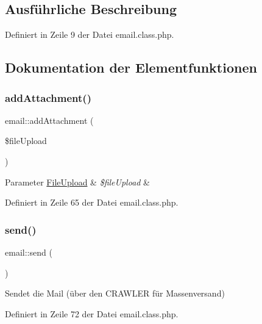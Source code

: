 \subsection{Ausführliche Beschreibung}


Definiert in Zeile 9 der Datei email.\+class.\+php.



\subsection{Dokumentation der Elementfunktionen}
\mbox{\label{classemail_a802b48dc37651e8c44f4d0584382bf0e}} 
\subsubsection{\texorpdfstring{add\+Attachment()}{addAttachment()}}
{\footnotesize\ttfamily email\+::add\+Attachment (\begin{DoxyParamCaption}\item[{}]{\$file\+Upload }\end{DoxyParamCaption})}


\begin{DoxyParams}[1]{Parameter}
\mbox{\hyperlink{class_file_upload}{File\+Upload}} & {\em \$file\+Upload} & \\
\hline
\end{DoxyParams}


Definiert in Zeile 65 der Datei email.\+class.\+php.

\mbox{\label{classemail_aa8ee20c15a47f497aa4c980ea1548998}} 
\subsubsection{\texorpdfstring{send()}{send()}}
{\footnotesize\ttfamily email\+::send (\begin{DoxyParamCaption}{ }\end{DoxyParamCaption})}

Sendet die Mail (über den C\+R\+A\+W\+L\+ER für Massenversand) 

Definiert in Zeile 72 der Datei email.\+class.\+php.

\mbox{\label{classemail_ad02548f68725abf88f81619d5a470366}} 
